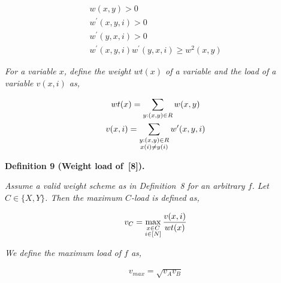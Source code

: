 \documentclass[10pt,a4paper]{article}
\begin{document}
\[\begin{gathered}
\displaystyle w(x,y)>0 \\
\displaystyle w^{\prime}(x,y,i)>0 \\
\displaystyle w^{\prime}(y,x,i)>0 \\
\displaystyle w^{\prime}(x,y,i)w^{\prime}(y,x,i)\geq w^{2}(x,y)
\end{gathered}\]


\emph{For a variable $x$, define the weight $wt(x)$ of a variable and the load of a variable $v(x,i)$ as,}\par


\[\begin{gathered}
\displaystyle wt(x) \displaystyle=\sum_{y:(x,y)\in R}w(x,y) \\
\displaystyle v(x,i) \displaystyle=\sum_{\begin{subarray}{c}y:(x,y)\in R\\
x(i)\neq y(i)\end{subarray}}w^{\prime}(x,y,i)
\end{gathered}\]







\par\medskip\noindent\textbf{
\textbf{Definition 9}\textbf{ }(Weight load of [8])\textbf{.}
}\par



\emph{Assume a valid weight scheme as in Definition 8 for an arbitrary $f$. Let $C\in\{X,Y\}$. Then the maximum $C$-load is defined as,}\par


\[\begin{gathered}
\displaystyle v_{C}=\max_{\begin{subarray}{c}x\in C\\
i\in[N]\end{subarray}}\frac{v(x,i)}{wt(x)}
\end{gathered}\]


\emph{We define the maximum load of $f$ as,}\par


\[\begin{gathered}
\displaystyle v_{max}=\sqrt{v_{A}v_{B}}
\end{gathered}\]



\end{document}
